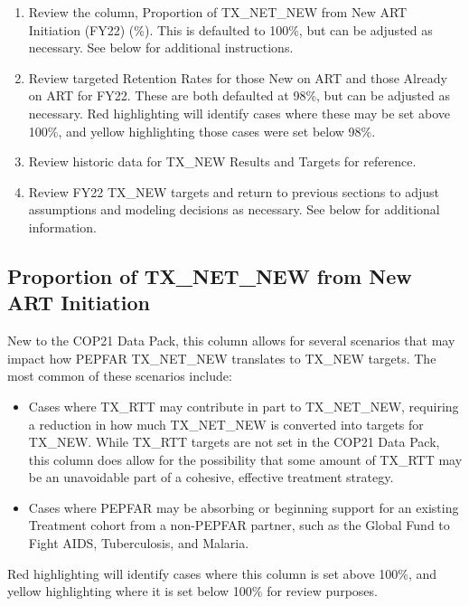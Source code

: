 \documentclass[
  openany]{book}
\begin{document}
\begin{enumerate}
\def\labelenumi{\arabic{enumi}.}
\item
  Review the column, Proportion of TX\_NET\_NEW from New ART Initiation
  (FY22) (\%). This is defaulted to 100\%, but can be adjusted as
  necessary. See below for additional instructions.
\item
  Review targeted Retention Rates for those New on ART and those
  Already on ART for FY22. These are both defaulted at 98\%, but can be
  adjusted as necessary. Red highlighting will identify cases where
  these may be set above 100\%, and yellow highlighting those cases
  were set below 98\%.
\item
  Review historic data for TX\_NEW Results and Targets for reference.
\item
  Review FY22 TX\_NEW targets and return to previous sections to adjust
  assumptions and modeling decisions as necessary. See below for
  additional information.
\end{enumerate}

\hypertarget{proportion-of-tx_net_new-from-new-art-initiation}{%
\subsection{Proportion of TX\_NET\_NEW from New ART Initiation}\label{proportion-of-tx_net_new-from-new-art-initiation}}

New to the COP21 Data Pack, this column allows for several scenarios
that may impact how PEPFAR TX\_NET\_NEW translates to TX\_NEW targets. The
most common of these scenarios include:

\begin{itemize}
\item
  Cases where TX\_RTT may contribute in part to TX\_NET\_NEW, requiring a
  reduction in how much TX\_NET\_NEW is converted into targets for
  TX\_NEW. While TX\_RTT targets are not set in the COP21 Data Pack,
  this column does allow for the possibility that some amount of
  TX\_RTT may be an unavoidable part of a cohesive, effective treatment
  strategy.
\item
  Cases where PEPFAR may be absorbing or beginning support for an
  existing Treatment cohort from a non-PEPFAR partner, such as the
  Global Fund to Fight AIDS, Tuberculosis, and Malaria.
\end{itemize}

Red highlighting will identify cases where this column is set above
100\%, and yellow highlighting where it is set below 100\% for review
purposes.
\end{document}
